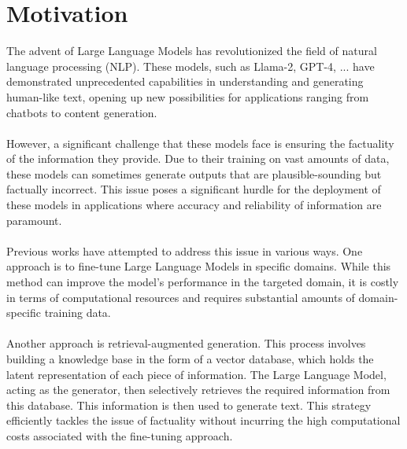 \section{Motivation}
The advent of Large Language Models has revolutionized the field of natural language processing (NLP). These models, such as Llama-2, GPT-4, ... have demonstrated unprecedented capabilities in understanding and generating human-like text, opening up new possibilities for applications ranging from chatbots to content generation.\\\\
However, a significant challenge that these models face is ensuring the factuality of the information they provide. Due to their training on vast amounts of data, these models can sometimes generate outputs that are plausible-sounding but factually incorrect. This issue poses a significant hurdle for the deployment of these models in applications where accuracy and reliability of information are paramount.\\\\
Previous works have attempted to address this issue in various ways. One approach is to fine-tune Large Language Models in specific domains. While this method can improve the model's performance in the targeted domain, it is costly in terms of computational resources and requires substantial amounts of domain-specific training data.\\\\
Another approach is retrieval-augmented generation. This process involves building a knowledge base in the form of a vector database, which holds the latent representation of each piece of information. The Large Language Model, acting as the generator, then selectively retrieves the required information from this database. This information is then used to generate text. This strategy efficiently tackles the issue of factuality without incurring the high computational costs associated with the fine-tuning approach.\\\\
